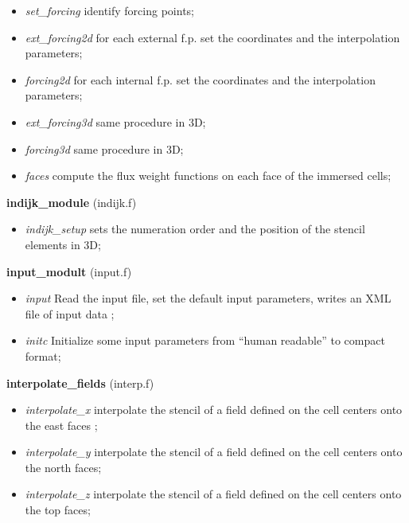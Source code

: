 \begin{itemize}
\item{\em set\_forcing} identify forcing points;
\item{\em ext\_forcing2d} for each external f.p. set the coordinates and the interpolation parameters;
\item{\em forcing2d} for each internal f.p. set the coordinates and the interpolation parameters;
\item{\em ext\_forcing3d} same procedure in 3D;
\item{\em forcing3d} same procedure in 3D;
\item{\em faces} compute the flux weight functions on each face of the immersed cells;
\end{itemize}
%
%
{\large{\bf indijk\_module}} (indijk.f) \\
\begin{itemize}
\item{\em indijk\_setup} sets the numeration order and the position of the stencil elements in 3D;
\end{itemize}
%
%
{\large{\bf input\_modult}} (input.f)\\
\begin{itemize}
\item{\em input} Read the input file, set the default input parameters, writes an XML file of input data ;
\item{\em initc} Initialize some input parameters from ``human readable'' to compact format;
\end{itemize}
%
%
{\large{\bf interpolate\_fields}} (interp.f)\\
\begin{itemize}
\item{\em interpolate\_x} interpolate the stencil of a field defined on the cell centers onto the east faces ;
\item{\em interpolate\_y}  interpolate the stencil of a field defined on the cell centers onto the north faces;
\item{\em interpolate\_z}  interpolate the stencil of a field defined on the cell centers onto the top faces;
\end{itemize}
%
